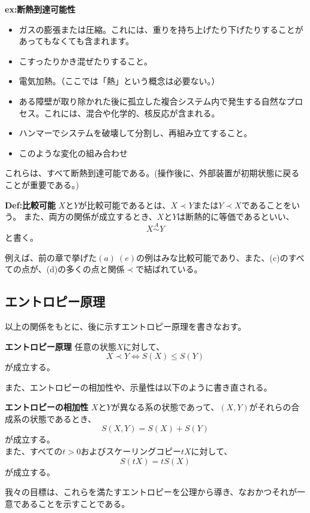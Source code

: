 \documentclass[a4paper,11pt]{jsarticle}
\numberwithin{equation}{section}
\begin{document}
\textbf{ex:断熱到達可能性}\\
\begin{itemize}
    \item ガスの膨張または圧縮。これには、重りを持ち上げたり下げたりすることがあってもなくても含まれます。
    \item こすったりかき混ぜたりすること。
    \item 電気加熱。（ここでは「熱」という概念は必要ない。）
    \item ある障壁が取り除かれた後に孤立した複合システム内で発生する自然なプロセス。これには、混合や化学的、核反応が含まれる。
    \item ハンマーでシステムを破壊して分割し、再組み立てすること。
    \item このような変化の組み合わせ
\end{itemize}
これらは、すべて断熱到達可能である。(操作後に、外部装置が初期状態に戻ることが重要である。)\\

\begin{itembox}[l]{\textbf{Def:比較可能}}
    $X$と$Y$が比較可能であるとは、$X \prec Y$または$Y \prec X$であることをいう。
    また、両方の関係が成立するとき、$X$と$Y$は断熱的に等価であるといい、
    \begin{equation}
        X \overset{A}{\sim} Y
    \end{equation}
    と書く。

\end{itembox}
例えば、前の章で挙げた$(a)~(e)$の例はみな比較可能であり、また、(c)のすべての点が、(d)の多くの点と関係$\prec$で結ばれている。\\

\subsection{エントロピー原理}
以上の関係をもとに、後に示すエントロピー原理を書きなおす。
\begin{itembox}[l]{\textbf{エントロピー原理}}
    任意の状態$X$に対して、
    \begin{equation}
        X \prec Y \Leftrightarrow S(X) \leq S(Y)
    \end{equation}
    が成立する。
\end{itembox}
また、エントロピーの相加性や、示量性は以下のように書き直される。
\begin{itembox}[l]{\textbf{エントロピーの相加性}}
    $X$と$Y$が異なる系の状態であって、$(X,Y)$がそれらの合成系の状態であるとき、
    \begin{equation}
        S(X,Y)=S(X)+S(Y)
    \end{equation}
    が成立する。\\
    また、すべての$t>0$およびスケーリングコピー$tX$に対して、
    \begin{equation}
        S(tX)=tS(X)
    \end{equation}
    が成立する。
\end{itembox}
我々の目標は、これらを満たすエントロピーを公理から導き、なおかつそれが一意であることを示すことである。\\
\end{document}
